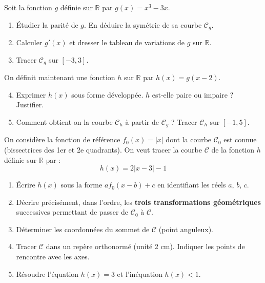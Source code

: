 \documentclass[11pt]{article}
\begin{document}
\begin{exercice}
\label{exo:probatoire2}
Soit la fonction $g$ définie sur $\mathbb{R}$ par $g(x) = x^3 - 3x$.
\begin{enumerate}
    \item Étudier la parité de $g$. En déduire la symétrie de sa courbe $\mathcal{C}_g$.
    \item Calculer $g'(x)$ et dresser le tableau de variations de $g$ sur $\mathbb{R}$.
    \item Tracer $\mathcal{C}_g$ sur $[-3, 3]$.
\end{enumerate}
On définit maintenant une fonction $h$ sur $\mathbb{R}$ par $h(x) = g(x-2)$.
\begin{enumerate}
    \setcounter{enumi}{3}
    \item Exprimer $h(x)$ sous forme développée. $h$ est-elle paire ou impaire ? Justifier.
    \item Comment obtient-on la courbe $\mathcal{C}_h$ à partir de $\mathcal{C}_g$ ? Tracer $\mathcal{C}_h$ sur $[-1, 5]$.
\end{enumerate}
\end{exercice}

\begin{exercice}
\label{exo:probatoire3}
On considère la fonction de référence $f_0(x) = |x|$ dont la courbe $\mathcal{C}_0$ est connue (bissectrices des 1er et 2e quadrants).
On veut tracer la courbe $\mathcal{C}$ de la fonction $h$ définie sur $\mathbb{R}$ par :
\[ h(x) = 2|x-3| - 1 \]
\begin{enumerate}
    \item Écrire $h(x)$ sous la forme $a f_0(x - b) + c$ en identifiant les réels $a$, $b$, $c$.
    \item Décrire précisément, dans l'ordre, les \textbf{trois transformations géométriques} successives permettant de passer de $\mathcal{C}_0$ à $\mathcal{C}$.
    \item Déterminer les coordonnées du sommet de $\mathcal{C}$ (point anguleux).
    \item Tracer $\mathcal{C}$ dans un repère orthonormé (unité 2 cm). Indiquer les points de rencontre avec les axes.
    \item Résoudre l'équation $h(x) = 3$ et l'inéquation $h(x) < 1$.
\end{enumerate}
\end{exercice}
\end{document}
